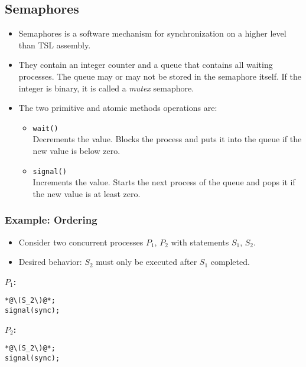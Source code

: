         \subsection{Semaphores}
            \begin{itemize}
            	\item Semaphores is a software mechanism for synchronization on a higher level than TSL assembly.
            	\item They contain an integer counter and a queue that contains all waiting processes. The queue may or may not be stored in the semaphore itself. If the integer is binary, it is called a \textit{mutex} semaphore.
            	\item The two primitive and atomic methods operations are:
                	\begin{itemize}
                		\item \texttt{wait()} \\ Decrements the value. Blocks the process and puts it into the queue if the new value is below zero.
                		\item \texttt{signal()} \\ Increments the value. Starts the next process of the queue and pops it if the new value is at least zero.
                	\end{itemize}
            \end{itemize}

            \subsubsection{Example: Ordering}
                \begin{itemize}
                	\item Consider two concurrent processes \(P_1\), \(P_2\) with statements \(S_1\), \(S_2\).
                	\item Desired behavior: \(S_2\) must only be executed after \(S_1\) completed.
                \end{itemize}
            
                \textbf{\(P_1\):}
                \begin{lstlisting}
*@\(S_2\)@*;
signal(sync);
\end{lstlisting}
                
                \textbf{\(P_2\):}
                \begin{lstlisting}
*@\(S_2\)@*;
signal(sync);
\end{lstlisting}

